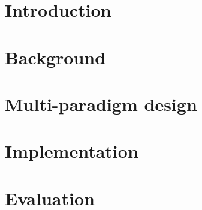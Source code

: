 \documentclass{article}
\begin{document}

\clearpage

\tableofcontents
\clearpage

\section{Introduction}
\label{sec:intro}


\section{Background}
\label{sec:background}


\section{Multi-paradigm design}
\label{sec:design}





\section{Implementation}
\label{sec:implementation}







\section{Evaluation}

\end{document}
